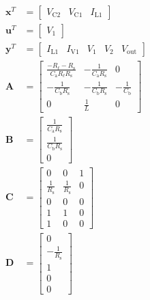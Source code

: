 \begin{align}
\mathbf{x}^T &= \left[\begin{matrix}V_{\mathrm{C2}} & V_{\mathrm{C1}} & I_{\mathrm{L1}}\end{matrix}\right]\label{eqn-ss-PN-x} \\
\mathbf{u}^T &= \left[\begin{matrix}V_{1}\end{matrix}\right]\label{eqn-ss-PN-u} \\
\mathbf{y}^T &= \left[\begin{matrix}I_{\mathrm{L1}} & I_{\mathrm{V1}} & V_{1} & V_{2} & V_{\mathrm{out}}\end{matrix}\right]\label{eqn-ss-PN-y} \\
\mathbf{A} &= \left[\begin{matrix}\frac{- R_{\ell} - R_{\mathrm{s}}}{C_{\mathrm{a}} R_{\ell} R_{\mathrm{s}}} & - \frac{1}{C_{\mathrm{a}} R_{\mathrm{s}}} & 0\\- \frac{1}{C_{\mathrm{b}} R_{\mathrm{s}}} & - \frac{1}{C_{\mathrm{b}} R_{\mathrm{s}}} & - \frac{1}{C_{\mathrm{b}}}\\0 & \frac{1}{L} & 0\end{matrix}\right]\label{eqn-ss-PN-A} \\
\mathbf{B} &= \left[\begin{matrix}\frac{1}{C_{\mathrm{a}} R_{\mathrm{s}}}\\\frac{1}{C_{\mathrm{b}} R_{\mathrm{s}}}\\0\end{matrix}\right]\label{eqn-ss-PN-B} \\
\mathbf{C} &= \left[\begin{matrix}0 & 0 & 1\\\frac{1}{R_{\mathrm{s}}} & \frac{1}{R_{\mathrm{s}}} & 0\\0 & 0 & 0\\1 & 1 & 0\\1 & 0 & 0\end{matrix}\right]\label{eqn-ss-PN-C} \\
\mathbf{D} &= \left[\begin{matrix}0\\- \frac{1}{R_{\mathrm{s}}}\\1\\0\\0\end{matrix}\right]\label{eqn-ss-PN-D}
\end{align}

